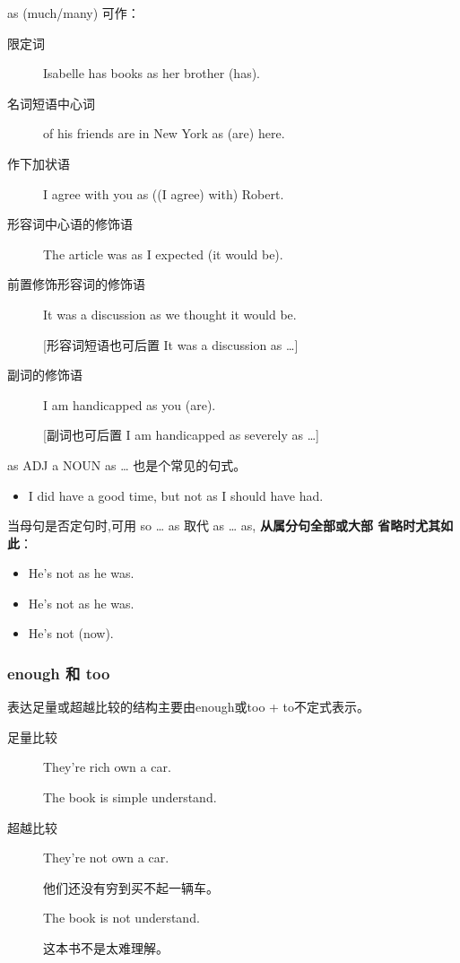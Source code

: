 as (much/many) 可作：
\begin{description}
\item[限定词] Isabelle has  books as her brother (has).

\item[名词短语中心词]  of his friends are in New York as (are) here.

\item[作下加状语] I agree with you  as ((I agree) with) Robert.

\item[形容词中心语的修饰语] The article was  as I expected (it
  would be).

\item[前置修饰形容词的修饰语] It was  a discussion as we thought it would be.

  [形容词短语也可后置 It was a discussion  as \ldots{}]

\item[副词的修饰语] I am  handicapped as you (are).

  [副词也可后置 I am handicapped as severely as \ldots{}]
\end{description}

as ADJ a NOUN as \ldots{} 也是个常见的句式。
\begin{itemize}
\item  I did have a good time, but not  as I should have had.
\end{itemize}

当母句是否定句时,可用 so \ldots{} as 取代 as \ldots{} as, \textbf{从属分句全部或大部
省略时尤其如此}：
\begin{itemize}
\item He's not  as he was.
\item He's not  as he was.
\item He's not  (now).
\end{itemize}

\subsubsection{enough 和 too}

表达足量或超越比较的结构主要由enough或too + to不定式表示。
\begin{description}
\item[足量比较] They're rich  own a car.

  The book is simple  understand.

\item[超越比较] They're not  own a car.

  他们还没有穷到买不起一辆车。

  The book is not  understand.

  这本书不是太难理解。
\end{description}

